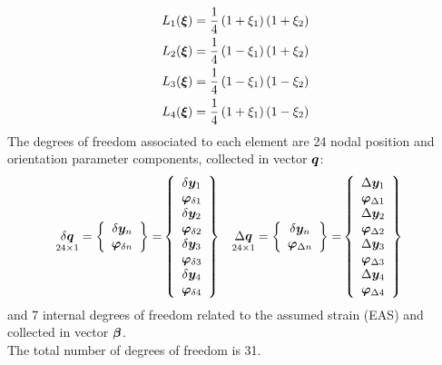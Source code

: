 \begin{subequations}
\begin{align}
L_1(\T{\xi}) & = \frac{1}{4} \plbr{ 1 + \xi_1 } \plbr{ 1 + \xi_2 } \\
L_2(\T{\xi}) & = \frac{1}{4} \plbr{ 1 - \xi_1 } \plbr{ 1 + \xi_2 } \\
L_3(\T{\xi}) & = \frac{1}{4} \plbr{ 1 - \xi_1 } \plbr{ 1 - \xi_2 } \\
L_4(\T{\xi}) & = \frac{1}{4} \plbr{ 1 + \xi_1 } \plbr{ 1 - \xi_2 }
\end{align}
\end{subequations}
The degrees of freedom associated to each element are 24 nodal position
and orientation parameter components, collected in vector ${\T{q}}$:
\begin{align}
\underset{24 \times 1}{\delta{\T{q}}}  =
\cubr{\vvect{c}{
\delta \T{y}_{n} \\
\T{\varphi}_{\delta n} \\
}}
 = &
\cubr{\vvect{c}{
\delta \T{y}_{1} \\
\T{\varphi}_{\delta 1} \\
\delta \T{y}_{2} \\
\T{\varphi}_{\delta 2} \\
\delta \T{y}_{3} \\
\T{\varphi}_{\delta 3} \\
\delta \T{y}_{4} \\
\T{\varphi}_{\delta 4} \\
}}
&
\underset{24 \times 1}{\Delta{\T{q}}}  =
\cubr{\vvect{c}{
\delta \T{y}_{n} \\
\T{\varphi}_{\Delta n} \\
}}
 = &
\cubr{\vvect{c}{
\Delta \T{y}_{1} \\
\T{\varphi}_{\Delta 1} \\
\Delta \T{y}_{2} \\
\T{\varphi}_{\Delta 2} \\
\Delta \T{y}_{3} \\
\T{\varphi}_{\Delta 3} \\
\Delta \T{y}_{4} \\
\T{\varphi}_{\Delta 4} \\
}}
\end{align}
and 7 internal degrees of freedom related to the assumed strain (EAS) and collected in vector $\T{\beta}$.\\
The total number of degrees of freedom is 31.
